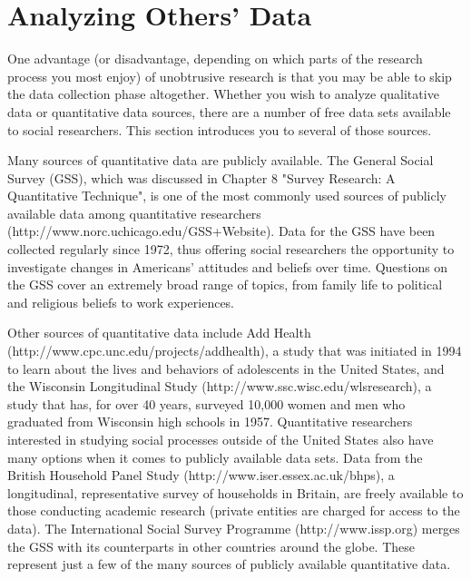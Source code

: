 \section{Analyzing Others' Data}


One advantage (or disadvantage, depending on which parts of the research process you most enjoy) of unobtrusive research is that you may be able to skip the data collection phase altogether. Whether you wish to analyze qualitative data or quantitative data sources, there are a number of free data sets available to social researchers. This section introduces you to several of those sources.

Many sources of quantitative data are publicly available. The General Social Survey (GSS), which was discussed in Chapter 8 "Survey Research: A Quantitative Technique", is one of the most commonly used sources of publicly available data among quantitative researchers (http://www.norc.uchicago.edu/GSS+Website). Data for the GSS have been collected regularly since 1972, thus offering social researchers the opportunity to investigate changes in Americans’ attitudes and beliefs over time. Questions on the GSS cover an extremely broad range of topics, from family life to political and religious beliefs to work experiences.

Other sources of quantitative data include Add Health (http://www.cpc.unc.edu/projects/addhealth), a study that was initiated in 1994 to learn about the lives and behaviors of adolescents in the United States, and the Wisconsin Longitudinal Study (http://www.ssc.wisc.edu/wlsresearch), a study that has, for over 40 years, surveyed 10,000 women and men who graduated from Wisconsin high schools in 1957. Quantitative researchers interested in studying social processes outside of the United States also have many options when it comes to publicly available data sets. Data from the British Household Panel Study (http://www.iser.essex.ac.uk/bhps), a longitudinal, representative survey of households in Britain, are freely available to those conducting academic research (private entities are charged for access to the data). The International Social Survey Programme (http://www.issp.org) merges the GSS with its counterparts in other countries around the globe. These represent just a few of the many sources of publicly available quantitative data.

